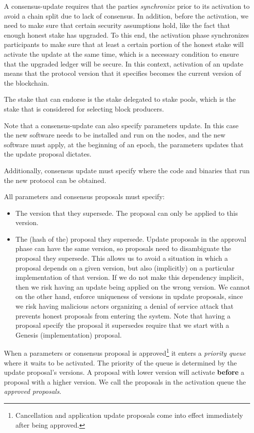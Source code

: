 A consensus-update requires that the parties \emph{synchronize} prior to its
activation to avoid a chain split due to lack of consensus. In addition, before
the activation, we need to make sure that certain security assumptions hold,
like the fact that enough honest stake has upgraded.
%
To this end, the activation phase synchronizes participants to make sure that at
least a certain portion of the honest stake will activate the update at the same
time, which is a necessary condition to ensure that the upgraded ledger will be
secure.
%
In this context, activation of an update means that the protocol version that it
specifies becomes the current version of the blockchain.

The stake that can endorse is the stake delegated to stake pools, which is the
stake that is considered for selecting block producers.

Note that a consensus-update can also specify parameters update. In this case
the new software needs to be installed and run on the nodes, and the new
software must apply, at the beginning of an epoch, the parameters updates that
the update proposal dictates.

Additionally, consensus update must specify where the code and binaries that
run the new protocol can be obtained.

All parameters and consensus proposals must specify:
\begin{itemize}
\item The version that they supersede. The proposal can only be applied to this
  version.
\item The (hash of the) proposal they supersede. Update proposals in the
  approval phase can have the same version, so proposals need to disambiguate
  the proposal they supersede. This allows us to avoid a situation in which a
  proposal depends on a given version, but also (implicitly) on a particular
  implementation of that version. If we do not make this dependency implicit,
  then we risk having an update being applied on the wrong version.
  We cannot on the other hand, enforce uniqueness of versions in update
  proposals, since we risk having malicious actors organizing a denial of
  service attack that prevents honest proposals from entering the system.
  Note that having a proposal specify the proposal it supersedes require that we
  start with a Genesis (implementation) proposal.
\end{itemize}

When a parameters or consensus proposal is approved\footnote{Cancellation and
  application update proposals come into effect immediately after being
  approved.} it enters a \emph{priority queue} where it waits to be activated.
The priority of the queue is determined by the update proposal's versions. A
proposal with lower version will activate \textbf{before} a proposal with a
higher version.
%
We call the proposals in the activation queue the \emph{approved proposals}.

